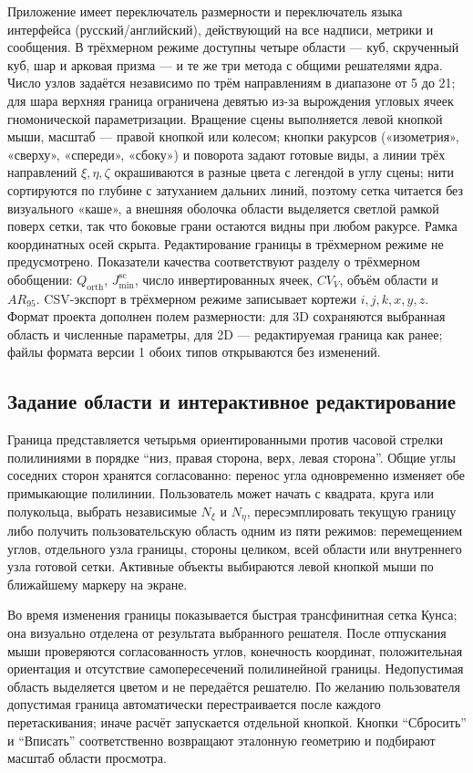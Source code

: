 \documentclass[11pt,a4paper]{article}
\newcommand{\Jsc}{J_{\min}^{\mathrm{sc}}}
\begin{document}
Приложение имеет переключатель размерности и переключатель языка
интерфейса (русский/английский), действующий на все надписи, метрики и
сообщения. В трёхмерном режиме доступны
четыре области --- куб, скрученный куб, шар и арковая призма --- и те же
три метода с общими решателями ядра. Число узлов задаётся независимо по
трём направлениям в диапазоне от 5 до 21; для шара верхняя граница
ограничена девятью из-за вырождения угловых ячеек гномонической
параметризации. Вращение сцены выполняется левой кнопкой мыши, масштаб
--- правой кнопкой или колесом; кнопки ракурсов («изометрия», «сверху»,
«спереди», «сбоку»)
и поворота задают готовые виды, а линии трёх направлений \(\xi,\eta,\zeta\)
окрашиваются в разные цвета с легендой в углу сцены; нити сортируются по
глубине с затуханием дальних линий, поэтому сетка читается без
визуального «каше», а внешняя оболочка области выделяется светлой рамкой
поверх сетки, так что боковые грани остаются видны при любом ракурсе.
Рамка координатных
осей скрыта. Редактирование границы в трёхмерном режиме не
предусмотрено. Показатели качества соответствуют разделу о трёхмерном
обобщении: \(Q_{\mathrm{orth}}\), \(\Jsc\), число инвертированных ячеек,
\(CV_V\), объём области и \(AR_{95}\). CSV-экспорт в трёхмерном режиме
записывает кортежи \(i,j,k,x,y,z\). Формат проекта дополнен полем
размерности: для 3D сохраняются выбранная область и численные параметры,
для 2D --- редактируемая граница как ранее; файлы формата версии 1
обоих типов открываются без изменений.

\subsection{Задание области и интерактивное редактирование}

Граница представляется четырьмя ориентированными против часовой стрелки
полилиниями в порядке ``низ, правая сторона, верх, левая сторона''.
Общие углы соседних сторон хранятся согласованно: перенос угла
одновременно изменяет обе примыкающие полилинии. Пользователь может
начать с квадрата, круга или полукольца, выбрать независимые
\(N_\xi\) и \(N_\eta\), пересэмплировать текущую границу либо получить
пользовательскую область одним из пяти режимов:
перемещением углов, отдельного узла границы, стороны целиком, всей
области или внутреннего узла готовой сетки. Активные объекты выбираются
левой кнопкой мыши по ближайшему маркеру на экране.

Во время изменения границы показывается быстрая трансфинитная сетка
Кунса; она визуально отделена от результата выбранного решателя. После
отпускания мыши проверяются согласованность углов, конечность координат,
положительная ориентация и отсутствие самопересечений полилинейной
границы. Недопустимая область выделяется цветом и не передаётся
решателю. По желанию пользователя допустимая граница автоматически
перестраивается после каждого перетаскивания; иначе расчёт запускается
отдельной кнопкой. Кнопки ``Сбросить'' и ``Вписать'' соответственно
возвращают эталонную геометрию и подбирают масштаб области просмотра.
\end{document}
